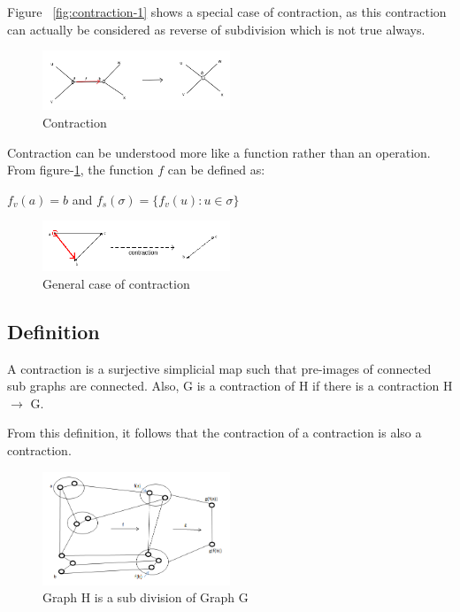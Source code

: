 \documentclass{article}
\begin{document}
Figure ~\ref{fig:contraction-1} shows a special case of contraction, as this contraction can actually be considered as reverse of subdivision which is not true always.

\begin{figure}[!h]
    \centering
    \includegraphics[width=0.5\textwidth]{images/contraction-2.png}
    \caption{Contraction}
    \label{fig:contraction-2}
\end{figure}

Contraction can be understood more like a function rather than an operation. From figure-\ref{fig:contraction-2}, the function $f$ can be defined as:

$f_v(a) = b$ and $f_s(\sigma) = \{f_v(u): u \in \sigma \}$

\begin{figure}[!h]
    \centering
    \includegraphics[width=0.5\textwidth]{images/contraction-3.png}
    \caption{General case of contraction}
    \label{fig:gen_cont}
\end{figure}

\subsection{\textbf{Definition}}
A contraction is a surjective simplicial map such that pre-images of connected sub graphs are connected. Also, G is a contraction of H if there is a contraction H$\rightarrow$ G.

From this definition, it follows that the contraction of a contraction is also a contraction.
\begin{figure}[!h]
    \centering
    \includegraphics[width=0.5\textwidth]{images/Compose_Contraction.png}
    \caption{Graph H is a sub division of Graph G}
    \label{fig:Compose_Contraction}
\end{figure}
\end{document}

